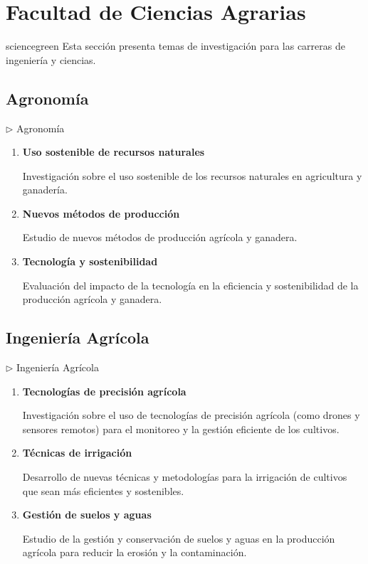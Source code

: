 \documentclass[12pt,a4paper]{article}
\begin{document}
\section{Facultad de Ciencias Agrarias}

\begin{facultybox}{sciencegreen}{}
Esta sección presenta temas de investigación para las carreras de ingeniería y ciencias.
\end{facultybox}

\subsection{Agronomía}

\begin{careerbox}{$\triangleright$ Agronomía}
	\begin{enumerate}
		\item \textbf{Uso sostenible de recursos naturales}
		
		Investigación sobre el uso sostenible de los recursos naturales en agricultura y ganadería.
		
		\item \textbf{Nuevos métodos de producción}
		
		Estudio de nuevos métodos de producción agrícola y ganadera.
		
		\item \textbf{Tecnología y sostenibilidad}
		
		Evaluación del impacto de la tecnología en la eficiencia y sostenibilidad de la producción agrícola y ganadera.
	\end{enumerate}
\end{careerbox}



\subsection{Ingeniería Agrícola}

\begin{careerbox}{$\triangleright$ Ingeniería Agrícola}
	\begin{enumerate}
		\item \textbf{Tecnologías de precisión agrícola}
		
		Investigación sobre el uso de tecnologías de precisión agrícola (como drones y sensores remotos) para el monitoreo y la gestión eficiente de los cultivos.
		
		\item \textbf{Técnicas de irrigación}
		
		Desarrollo de nuevas técnicas y metodologías para la irrigación de cultivos que sean más eficientes y sostenibles.
		
		\item \textbf{Gestión de suelos y aguas}
		
		Estudio de la gestión y conservación de suelos y aguas en la producción agrícola para reducir la erosión y la contaminación.
	\end{enumerate}
\end{careerbox}
\end{document}
